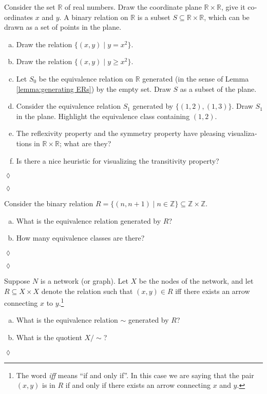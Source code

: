 \documentclass[a4paper]{book}
\def\ZZ{{\mathbb Z}}
\def\RR{{\mathbb R}}
\def\ss{\subseteq}
\def\|{{\;|\;}}
\theoremstyle{myth}
\newtheorem{excENG}[envENG]{\begin{english}Exercise\end{english}}
\newenvironment{exerciseENG}{\begin{excENG}}{\hspace*{\fill}$\lozenge$\end{excENG}}
\newtheorem{remarkRUS}[envRUS]{\begin{russian}Примечание\end{russian}}
\newtheorem{excRUS}[envRUS]{\begin{russian}Упражнение\end{russian}}
\newenvironment{exerciseRUS}{\begin{excRUS}}{\hspace*{\fill}$\lozenge$\end{excRUS}}
\def\sexc{\begin{enumerate}[a.)]\setlength{\itemsep}{.1cm}\setlength{\parskip}{.1cm}\item}
\def\next{\item}
\def\endsexc{\end{enumerate}}
\begin{document}
\begin{english}
\begin{remarkRUS}
\begin{russian} \end{russian}
\end{remarkRUS}

\begin{exerciseENG}
Consider the set $\RR$ of real numbers. Draw the coordinate plane $\RR\times\RR$, give it coordinates $x$ and $y$. A binary relation on $\RR$ is a subset $S\ss\RR\times\RR$, which can be drawn as a set of points in the plane. 
\sexc Draw the relation $\{(x,y)\|y=x^2\}$. 
\next Draw the relation $\{(x,y)\|y\geq x^2\}.$
\next Let $S_0$ be the equivalence relation on $\RR$ generated (in the sense of Lemma \ref{lemma:generating ERs}) by the empty set. Draw $S$ as a subset of the plane.
\next Consider the equivalence relation $S_1$ generated by $\{(1,2),(1,3)\}$. Draw $S_1$ in the plane. Highlight the equivalence class containing $(1,2)$.
\next The reflexivity property and the symmetry property have pleasing visualizations in $\RR\times\RR$; what are they? 
\next Is there a nice heuristic for visualizing the transitivity property?
\endsexc
\end{exerciseENG}

\begin{exerciseRUS}
\begin{russian} \end{russian}
\end{exerciseRUS}

\begin{exerciseENG}
Consider the binary relation $R=\{(n,n+1)\|n\in\ZZ\}\ss\ZZ\times\ZZ$. 
\sexc What is the equivalence relation generated by $R$? 
\next How many equivalence classes are there?
\endsexc
\end{exerciseENG}

\begin{exerciseRUS}
\begin{russian} \end{russian}
\end{exerciseRUS}

\begin{exerciseENG}
Suppose $N$ is a network (or graph). Let $X$ be the nodes of the network, and let $R\ss X\times X$ denote the relation such that $(x,y)\in R$ iff there exists an arrow connecting $x$ to $y$.\footnote{The word {\em iff} means “if and only if”. In this case we are saying that the pair $(x,y)$ is in $R$ if and only if there exists an arrow connecting $x$ and $y$.}
\sexc What is the equivalence relation $\sim$ generated by $R$? 
\next What is the quotient $X/\sim$?
\endsexc
\end{exerciseENG}


\end{english}
\end{document}
